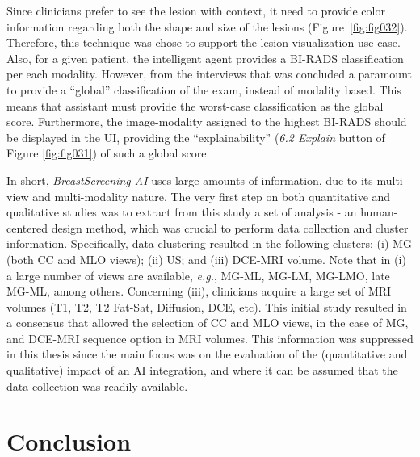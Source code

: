 Since clinicians prefer to see the lesion with context, it need to provide color information regarding both the shape and size of the lesions (Figure~\ref{fig:fig032}).
Therefore, this technique was chose to support the lesion visualization use case.
Also, for a given patient, the intelligent agent provides a \ac{BI-RADS} classification per each modality.
However, from the interviews that was concluded a paramount to provide a ``global'' classification of the exam, instead of modality based.
This means that assistant must provide the worst-case classification as the global score.
Furthermore, the image-modality assigned to the highest \ac{BI-RADS} should be displayed in the \ac{UI}, providing the ``explainability'' ({\it 6.2 Explain} button of Figure \ref{fig:fig031}) of such a global score.

In short, {\it BreastScreening-AI} uses large amounts of information, due to its multi-view and multi-modality nature.
The very first step on both quantitative and qualitative studies was to extract from this study a set of analysis - an human-centered design method, which was crucial to perform data collection and cluster information.
Specifically, data clustering resulted in the following clusters:
(i) \ac{MG} (both \ac{CC} and \ac{MLO} views);
(ii) \ac{US}; and
(iii) \ac{DCE}-\ac{MRI} volume.
Note that in (i) a large number of views are available, {\it e.g.}, MG-ML, MG-LM, MG-LMO, late MG-ML, among others.
Concerning (iii), clinicians acquire a large set of \ac{MRI} volumes (T1, T2, T2 Fat-Sat, Diffusion, \ac{DCE}, etc).
This initial study resulted in a consensus that allowed the selection of \ac{CC} and \ac{MLO} views, in the case of \ac{MG}, and \ac{DCE}-\ac{MRI} sequence option in \ac{MRI} volumes.
This information was suppressed in this thesis since the main focus was on the evaluation of the (quantitative and qualitative) impact of an \ac{AI} integration, and where it can be assumed that the data collection was readily available.

\section{Conclusion}
\label{sec:sec005008}

